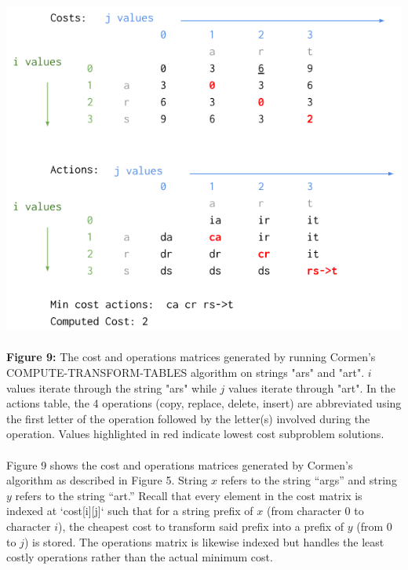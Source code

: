 \documentclass[12pt,letterpaper]{article}
\begin{document}
\includegraphics[scale=0.7]{images/fig9example1.png}
\paragraph{}
\begin{footnotesize}
    \noindent\textbf{Figure 9:} The cost and operations matrices generated by running Cormen's COMPUTE-TRANSFORM-TABLES algorithm on strings "ars" and "art". $i$ values iterate through the string "ars" while $j$ values iterate through "art". In the actions table, the 4 operations (copy, replace, delete, insert) are abbreviated using the first letter of the operation followed by the letter(s) involved during the operation. Values highlighted in red indicate lowest cost subproblem solutions.
\end{footnotesize}
\paragraph{}

Figure 9 shows the cost and operations matrices generated by Cormen’s algorithm as described in Figure 5. String $x$ refers to the string “args” and string $y$ refers to the string “art.” Recall that every element in the cost matrix is indexed at `cost[i][j]` such that for a string prefix of $x$ (from character 0 to character $i$), the cheapest cost to transform said prefix into a prefix of $y$ (from 0 to $j$) is stored. The operations matrix is likewise indexed but handles the least costly operations rather than the actual minimum cost. 
\end{document}
